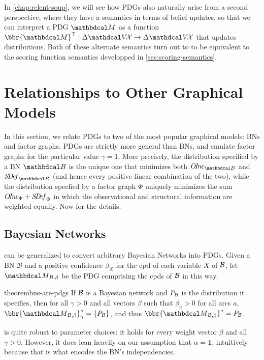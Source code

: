 In \cref{chap:relent-soup}, we will see how PDGs also naturally arise from a second perspective, where they have a semantics in terms of belief updates, so that we can interpret a PDG $\dg M$ as a function $\bbr{\dg M}^\top : \Delta \V\!\X \to \Delta \V\!\X$
that updates distributions.
%
Both of these alternate semantics turn out to to be equivalent to the scoring function semantics developped in \cref{sec:scoring-semantics}. 

\section{Relationships to Other Graphical Models}
    \label{sec:other-graphical-models} 

In this section, we relate
PDGs to two of the most popular graphical models: 
BNs and factor graphs.
PDGs are strictly more general than BNs, and emulate factor graphs for the particular value $\gamma = 1$. 
More precisely, the distribution specified by a BN $\dg B$
is the unique one that minimizes both $\OInc_{\dg B}$ and $\SDef_{\dg B}$ (and hence every positive linear combination of the two), while the
distribution specfied by a factor graph $\Phi$ uniquely minimizes the
sum $\OInc_{\Phi} + \SDef_{\Phi}$
in which the observational and structural information are weighted equally.
Now for the details.

\subsection{Bayesian Networks} 
    \label{sec:bn-pdg}

 can be generalized to convert arbitrary Bayesian Networks into PDGs.
Given a BN $\mathcal B$ and a positive confidence $\beta_X$ for
the cpd of each variable $X$ of $\cal B$,
let $\PDGof{\mathcal B, \beta}$
be the PDG comprising the cpds of $\cal B$
in this way.

	
\begin{linked}{theorem}{bns-are-pdgs}
 	  If $\cal B$ is a Bayesian network
          and $\Pr_{\cal B}$ is the distribution it specifies, then
        for all $\gamma > 0$ and all vectors $\beta$ such
        that $\beta_a > 0$ for all arcs $a$,
        $\bbr{\PDGof{\mathcal B, \beta}}_\gamma^* = \{ \Pr_{\cal B}\}$, 
and thus $\bbr{\PDGof{\mathcal B, \beta}}^* = \Pr_{\cal B}$.    
\end{linked}
 is quite robust to parameter choices: it holds for every
weight vector $\beta$ and all $\gamma > 0$.
However, it does lean heavily on our assumption that $\alpha = \mathbf 1$, intuitively because that is what encodes the BN's independencies. 

